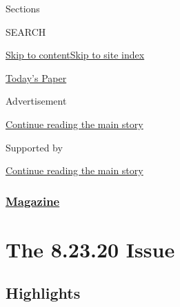 Sections

SEARCH

\protect\hyperlink{site-content}{Skip to
content}\protect\hyperlink{site-index}{Skip to site index}

\href{https://myaccount.nytimes3xbfgragh.onion/auth/login?response_type=cookie\&client_id=vi}{}

\href{https://www.nytimes3xbfgragh.onion/section/todayspaper}{Today's
Paper}

Advertisement

\protect\hyperlink{after-top}{Continue reading the main story}

Supported by

\protect\hyperlink{after-sponsor}{Continue reading the main story}

\hypertarget{magazine}{%
\subsubsection{\texorpdfstring{\href{/section/magazine}{Magazine}}{Magazine}}\label{magazine}}

\hypertarget{the-82320-issue}{%
\section{The 8.23.20 Issue}\label{the-82320-issue}}

\hypertarget{highlights}{%
\subsection{Highlights}\label{highlights}}

